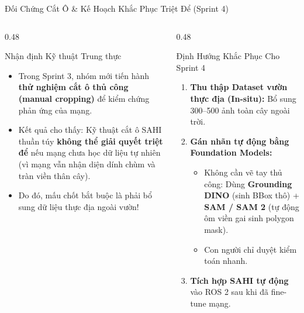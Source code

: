 \documentclass[aspectratio=169, 10pt]{beamer}
\begin{document}
\begin{frame}{Đối Chứng Cắt Ô \& Kế Hoạch Khắc Phục Triệt Để (Sprint 4)}
\begin{columns}[T]
\begin{column}{0.48\textwidth}
    \begin{alertblock}{Nhận định Kỹ thuật Trung thực}
    \scriptsize
    \begin{itemize}
        \item Trong Sprint 3, nhóm mới tiến hành \textbf{thử nghiệm cắt ô thủ công (manual cropping)} để kiểm chứng phản ứng của mạng.
        \item Kết quả cho thấy: Kỹ thuật cắt ô SAHI thuần túy \textbf{không thể giải quyết triệt để} nếu mạng chưa học dữ liệu tự nhiên (vì mạng vẫn nhận diện dính chùm và tràn viền thân cây).
        \item Do đó, mấu chốt bắt buộc là phải bổ sung dữ liệu thực địa ngoài vườn!
    \end{itemize}
    \end{alertblock}
\end{column}
\begin{column}{0.48\textwidth}
    \begin{exampleblock}{Định Hướng Khắc Phục Cho Sprint 4}
    \scriptsize
    \begin{enumerate}
        \item \textbf{Thu thập Dataset vườn thực địa (In-situ):} Bổ sung 300--500 ảnh toàn cây ngoài trời.
        \item \textbf{Gán nhãn tự động bằng Foundation Models:}
        \begin{itemize}
            \scriptsize
            \item Không cần vẽ tay thủ công: Dùng \textbf{Grounding DINO} \cite{liu2023grounding} (sinh BBox thô) + \textbf{SAM / SAM 2} \cite{kirillov2023segment} (tự động ôm viền gai sinh polygon mask).
            \item Con người chỉ duyệt kiểm toán nhanh.
        \end{itemize}
        \item \textbf{Tích hợp SAHI tự động \cite{akyon2022sahi}} vào ROS 2 sau khi đã fine-tune mạng.
    \end{enumerate}
    \end{exampleblock}
\end{column}
\end{columns}
\end{frame}
\end{document}

